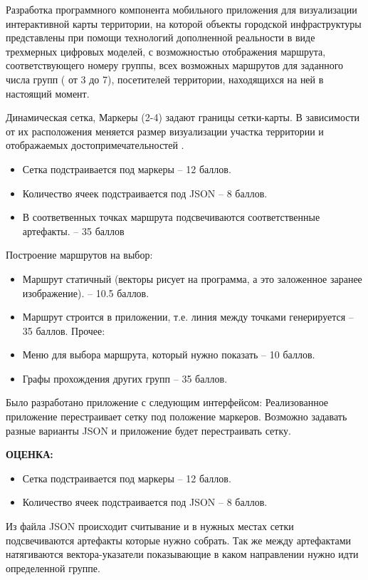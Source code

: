 
Разработка программного компонента мобильного приложения для визуализации интерактивной карты территории, на которой объекты городской инфраструктуры представлены при помощи технологий дополненной реальности в виде трехмерных цифровых моделей, с возможностью отображения маршрута, соответствующего номеру группы, всех возможных маршрутов для заданного числа групп ( от 3 до 7), посетителей территории, находящихся на ней в настоящий момент.

\markSection
Динамическая сетка, Маркеры (2-4) задают границы сетки-карты. В зависимости от их расположения  меняется размер визуализации участка территории и отображаемых достопримечательностей .
\begin{itemize}
    \item Сетка подстраивается под маркеры – 12 баллов. 
    \item Количество ячеек подстраивается под JSON – 8 баллов.
    \item В соответвенных точках маршрута подсвечиваются соответственные артефакты. – 35 баллов
\end{itemize}

Построение маршрутов на выбор:
\begin{itemize} 
    \item	Маршрут статичный (векторы рисует на программа, а это заложенное заранее изображение). – 10.5 баллов.
    \item	Маршрут строится в приложении, т.е. линия между точками генерируется – 35 баллов.
    Прочее:
    \item	Меню для выбора маршрута, который нужно показать – 10 баллов.
    \item	Графы прохождения других групп – 35 баллов.
\end{itemize}

\solutionSection
Было разработано приложение с следующим интерфейсом:
Реализованное приложение перестраивает сетку под положение маркеров. Возможно задавать разные варианты JSON и приложение будет перестраивать сетку.

\textbf{ОЦЕНКА:}
\begin{itemize}
    \item	Сетка подстраивается под маркеры – 12 баллов. 
    \item	Количество ячеек подстраивается под JSON – 8 баллов.
\end{itemize}
Из файла JSON происходит считывание и в нужных местах сетки подсвечиваются артефакты которые нужно собрать. Так же между артефактами натягиваются вектора-указатели показывающие в каком направлении нужно идти определенной группе.

